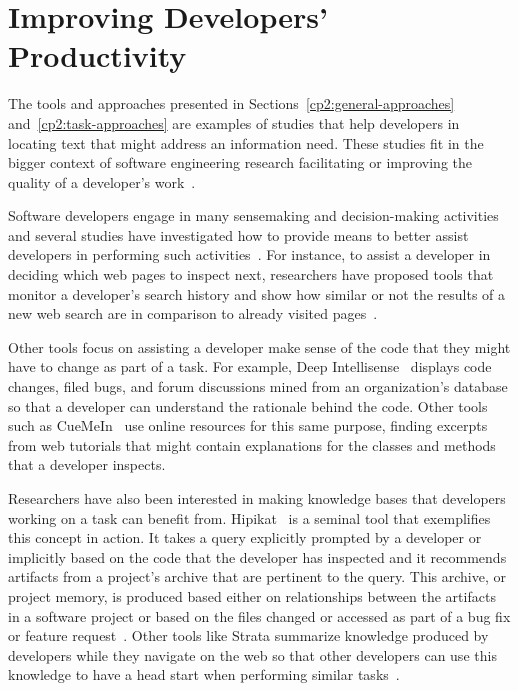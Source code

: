 



\section{Improving Developers' Productivity}
\label{cp2:dev-productivity}


The tools and approaches presented in Sections~\ref{cp2:general-approaches}
and~\ref{cp2:task-approaches}
are examples of studies that help developers in locating 
text that might address an information need.
These studies fit in the bigger context 
of software engineering research 
facilitating or improving the quality of a developer's work~\cite{Kersten2006, Meyer2017, satterfield2020}. 



Software developers engage in many sensemaking and decision-making activities~\cite{sillito2006} and several studies have investigated how to 
provide means to better  
assist developers in performing such activities~\cite{Liu2018Unakite, liu2021, barnett2015}.
For instance, to assist a developer in deciding which web pages to inspect next,
researchers have proposed tools that monitor a developer's search history
and show how similar or not the results of a new web search are in comparison to already visited 
pages~\cite{Ponzanelli2017}.



Other tools focus on assisting a developer make sense of the
code that they might have to change as part of a task. For example, 
Deep Intellisense~\cite{Holmes2008} displays code changes, filed bugs, and forum discussions
mined from an organization's database so that a developer can understand the rationale
behind the code.
Other tools such as CueMeIn~\cite{sun2021} use online resources for this same purpose, 
finding excerpts from web tutorials 
that might contain explanations 
for the classes and methods that a developer inspects. 



Researchers have also been interested in 
making knowledge bases
that developers working on a task can benefit from. 
Hipikat~\cite{Cubranic2005} is a seminal tool that exemplifies this concept in action.
It takes a query explicitly prompted by a developer 
or implicitly based on the code that the developer 
has inspected and  
it recommends artifacts from a project's archive 
that are pertinent to the query.
This archive, or project memory, is produced 
based either on relationships between the artifacts in a software project 
or based on the files changed or accessed as part of a bug fix or feature request~\cite{Cubranic2005}.
Other tools like Strata summarize knowledge produced by developers 
while they navigate on the web so that other developers
can use this knowledge to have a 
 head start when performing similar tasks~\cite{liu2021}.


